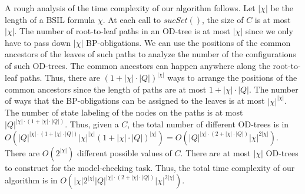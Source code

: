 \documentclass[11pt]{article}
\newcommand{\ttsynsuc}{\textit{sucSet}}
\begin{document}
A rough analysis of the time complexity of our algorithm follows. 
Let $|\chi|$ be the length of a BSIL formula $\chi$. 
At each call to $\ttsynsuc()$, the size of $C$ is at most $|\chi|$.  
The number of root-to-leaf paths in an OD-tree is at most
$|\chi|$ since we only have to pass down $|\chi|$ BP-obligations. 
We can use the positions of the common ancestors of the leaves of 
such paths to analyze the number of the configurations of 
such OD-trees. 
The common ancestors can happen anywhere along the root-to-leaf paths. 
Thus, there are $(1+|\chi|\cdot |Q|)^{|\chi|}$ ways to 
arrange the positions of the common ancestors since 
the length of paths are at most $1+|\chi|\cdot |Q|$.  
The number of ways that the BP-obligations can be assigned to the leaves 
is at most $|\chi|^{|\chi|}$.  
The number of state labeling of the nodes on the paths 
is at most $|Q|^{|\chi|\cdot(1+|\chi|\cdot|Q|)}$.  
Thus, given a $C$, the total number of different OD-trees 
is in
$O(|Q|^{|\chi|\cdot(1+|\chi|\cdot|Q|)}
|\chi|^{|\chi|}
(1+|\chi|\cdot |Q|)^{|\chi|})=
O(|Q|^{|\chi|\cdot(2+|\chi|\cdot|Q|)}|\chi|^{2|\chi|})$.  
There are $O(2^{|\chi|})$ different possible values of $C$.  
There are at most $|\chi|$ OD-trees to construct for 
the model-checking task. 
Thus, the total time complexity of our algorithm is in
$O(|\chi|2^{|\chi|}|Q|^{|\chi|\cdot(2+|\chi|\cdot|Q|)}|\chi|^{2|\chi|})$.    
\end{document}
